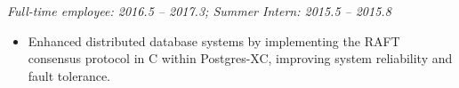 \documentclass[10pt]{resume}
\begin{document}
\vspace{-0.9em}
\vspace{-0.5em}
\textit{Full-time employee: 2016.5 -- 2017.3; Summer Intern: 2015.5 -- 2015.8}
\vspace{-0.2em}
\begin{itemize}
\item Enhanced distributed database systems by implementing the RAFT consensus protocol in C within Postgres-XC, improving system
reliability and fault tolerance.
\end{itemize}

\end{document}
